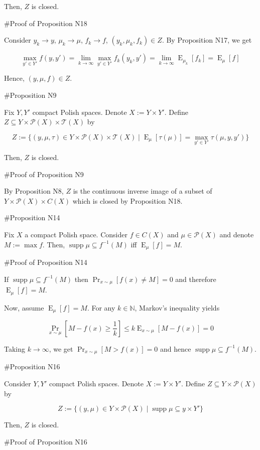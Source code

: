 \documentclass[a4paper]{article}
\DeclareMathOperator{\Supp}{supp}
\DeclareMathOperator{\Prb}{Pr}
\DeclareMathOperator{\E}{E}
\newcommand{\Nats}{\mathbb{N}}
\newcommand{\Prob}{\mathcal{P}}
\newcommand{\T}{\mathcal{T}}
\begin{document}
Then, ${Z}$ is closed.

\#Proof of Proposition N18

Consider ${y_k \rightarrow y}$, ${\mu_k \rightarrow \mu}$, ${f_k \rightarrow f}$, ${(y_k,\mu_k,f_k) \in Z}$. By Proposition N17, we get

$$\max_{y' \in Y'} f(y,y') = \lim_{k \rightarrow \infty} \max_{y' \in Y'} f_k(y_k,y')= \lim_{k \rightarrow \infty} \E_{\mu_k}[f_k] = \E_{\mu}[f]$$

Hence, ${(y,\mu,f) \in Z}$.

\#Proposition N9

Fix ${Y,Y'}$ compact Polish spaces. Denote ${X:=Y \times Y'}$. Define ${Z \subseteq Y \times \Prob(X) \times \T(X)}$ by

$$Z:=\{(y,\mu,\tau) \in Y \times \Prob(X) \times \T(X) \mid \E_\mu[\tau(\mu)] = \max_{y' \in Y'} \tau(\mu,y,y')\}$$

Then, ${Z}$ is closed.

\#Proof of Proposition N9

By Proposition N8, ${Z}$ is the continuous inverse image of a subset of ${Y \times \Prob(X) \times C(X)}$ which is closed by Proposition N18.

\#Proposition N14

Fix ${X}$ a compact Polish space. Consider ${f \in C(X)}$ and ${\mu \in \Prob(X)}$ and denote ${M := \max f}$. Then, ${\Supp \mu \subseteq f^{-1}(M)}$ iff ${\E_\mu[f] = M}$.

\#Proof of Proposition N14

If ${\Supp \mu \subseteq f^{-1}(M)}$ then $\Prb_{x\sim \mu}[f(x) \ne M] = 0$ and therefore ${\E_\mu[f] = M}$.

Now, assume ${\E_\mu[f] = M}$. For any ${k \in \Nats}$, Markov's inequality yields 

$$\Prb_{x\sim \mu}[M - f(x) \geq \frac{1}{k}] \leq k\E_{x \sim \mu}[M - f(x)] = 0$$

Taking $k \rightarrow \infty$, we get ${\Prb_{x\sim \mu}[M > f(x)] = 0}$ and hence ${\Supp \mu \subseteq f^{-1}(M)}$.

\#Proposition N16

Consider ${Y,Y'}$ compact Polish spaces. Denote ${X:=Y \times Y'}$. Define ${Z \subseteq Y \times \Prob(X)}$ by

$$Z:=\{(y,\mu) \in Y \times \Prob(X) \mid \Supp \mu \subseteq y \times Y'\}$$

Then, ${Z}$ is closed.

\#Proof of Proposition N16
\end{document}
